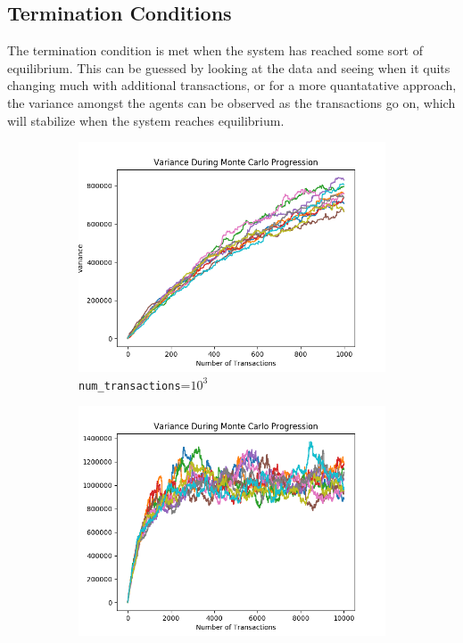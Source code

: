 \documentclass[12pt]{article} %
\begin{document}
\subsection{Termination Conditions}
The termination condition is met when the system has reached some sort of equilibrium.
This can be guessed by looking at the data and seeing when it quits changing
much with additional transactions, or for a more quantatative approach, the variance
amongst the agents can be observed as the transactions go on, which will
stabilize when the system reaches equilibrium.
\newcommand{\scaleVar}{0.45}
\begin{figure}
	\begin{subfigure}{0.5\textwidth}
		\centering
		\includegraphics[scale=\scaleVar]{variancenotconverged.png}
		\caption{\texttt{num\_transactions}=$10^3$}
		\label{fig:variancenotconverged}
	\end{subfigure}
	\begin{subfigure}{0.5\textwidth}
		\centering
		\includegraphics[scale=\scaleVar]{varianceconverged.png}

\end{subfigure}
\end{figure}
\end{document}
